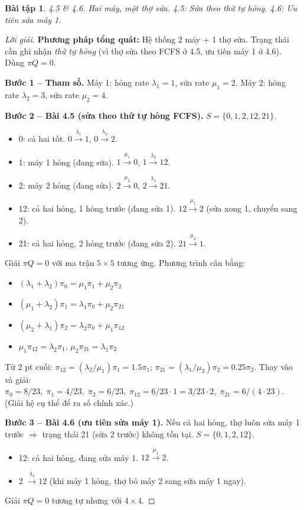 \documentclass[8pt,a4paper]{article}
\newtheorem{exercise}{Bài tập}
\newenvironment{solution}{\begin{proof}[Lời giải]}{\end{proof}}
\begin{document}
\begin{exercise}
4.5 \& 4.6. Hai máy, một thợ sửa. 4.5: Sửa theo thứ tự hỏng. 4.6: Ưu tiên sửa máy 1.
\end{exercise}
\begin{solution}
\textbf{Phương pháp tổng quát:} Hệ thống 2 máy + 1 thợ sửa. Trạng thái cần ghi nhận \emph{thứ tự hỏng} (vì thợ sửa theo FCFS ở 4.5, ưu tiên máy 1 ở 4.6). Dùng $\pi Q = 0$.

\textbf{Bước 1 -- Tham số.} Máy 1: hỏng rate $\lambda_1 = 1$, sửa rate $\mu_1 = 2$. Máy 2: hỏng rate $\lambda_2 = 3$, sửa rate $\mu_2 = 4$.

\textbf{Bước 2 -- Bài 4.5 (sửa theo thứ tự hỏng FCFS).} $S = \{0, 1, 2, 12, 21\}$.
\begin{itemize}[nosep]
\item 0: cả hai tốt. $0 \xrightarrow{\lambda_1} 1$, $0 \xrightarrow{\lambda_2} 2$.
\item 1: máy 1 hỏng (đang sửa). $1 \xrightarrow{\mu_1} 0$, $1 \xrightarrow{\lambda_2} 12$.
\item 2: máy 2 hỏng (đang sửa). $2 \xrightarrow{\mu_2} 0$, $2 \xrightarrow{\lambda_1} 21$.
\item 12: cả hai hỏng, 1 hỏng trước (đang sửa 1). $12 \xrightarrow{\mu_1} 2$ (sửa xong 1, chuyển sang 2).
\item 21: cả hai hỏng, 2 hỏng trước (đang sửa 2). $21 \xrightarrow{\mu_2} 1$.
\end{itemize}
Giải $\pi Q = 0$ với ma trận $5 \times 5$ tương ứng. Phương trình cân bằng:
\begin{itemize}[nosep]
\item $(\lambda_1+\lambda_2)\pi_0 = \mu_1\pi_1 + \mu_2\pi_2$
\item $(\mu_1+\lambda_2)\pi_1 = \lambda_1\pi_0 + \mu_2\pi_{21}$
\item $(\mu_2+\lambda_1)\pi_2 = \lambda_2\pi_0 + \mu_1\pi_{12}$
\item $\mu_1\pi_{12} = \lambda_2\pi_1$, \quad $\mu_2\pi_{21} = \lambda_1\pi_2$
\end{itemize}
Từ 2 pt cuối: $\pi_{12} = (\lambda_2/\mu_1)\pi_1 = 1.5\pi_1$; $\pi_{21} = (\lambda_1/\mu_2)\pi_2 = 0.25\pi_2$.
Thay vào và giải: $\pi_0 = 8/23,\; \pi_1 = 4/23,\; \pi_2 = 6/23,\; \pi_{12} = 6/23 \cdot 1 = 3/23 \cdot 2,\; \pi_{21} = 6/(4 \cdot 23)$. (Giải hệ cụ thể để ra số chính xác.)

\textbf{Bước 3 -- Bài 4.6 (ưu tiên sửa máy 1).} Nếu cả hai hỏng, thợ luôn sửa máy 1 trước $\Rightarrow$ trạng thái 21 (sửa 2 trước) không tồn tại. $S = \{0, 1, 2, 12\}$.
\begin{itemize}[nosep]
\item 12: cả hai hỏng, đang sửa máy 1. $12 \xrightarrow{\mu_1} 2$.
\item 2 $\xrightarrow{\lambda_1} 12$ (khi máy 1 hỏng, thợ bỏ máy 2 sang sửa máy 1 ngay).
\end{itemize}
Giải $\pi Q = 0$ tương tự nhưng với $4 \times 4$.


\end{solution}
\end{document}
